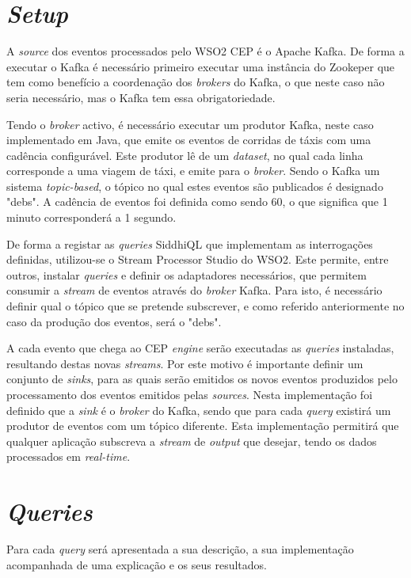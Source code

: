 \documentclass[article]{IEEEtran}
\begin{document}
\section{\textit{Setup}}

A \textit{source} dos eventos processados pelo WSO2 CEP é o Apache Kafka. De forma a executar o Kafka é necessário primeiro executar uma instância do Zookeper que tem como benefício a coordenação dos \textit{brokers} do Kafka, o que neste caso não seria necessário, mas o Kafka tem essa obrigatoriedade.

Tendo o \textit{broker} activo, é necessário executar um produtor Kafka, neste caso implementado em Java, que emite os eventos de corridas de táxis com uma cadência configurável. Este produtor lê de um \textit{dataset}, no qual cada linha corresponde a uma viagem de táxi, e emite para o \textit{broker}. Sendo o Kafka um sistema \textit{topic-based}, o tópico no qual estes eventos são publicados é designado "debs". A cadência de eventos foi definida como sendo 60, o que significa que 1 minuto corresponderá a 1 segundo.

De forma a registar as \textit{queries} SiddhiQL que implementam as interrogações definidas, utilizou-se o Stream Processor Studio do WSO2. Este permite, entre outros, instalar \textit{queries} e definir os adaptadores necessários, que permitem consumir a \textit{stream} de eventos através do \textit{broker} Kafka. Para isto, é necessário definir qual o tópico que se pretende subscrever, e como referido anteriormente no caso da produção dos eventos, será o "debs".

A cada evento que chega ao CEP \textit{engine} serão executadas as \textit{queries} instaladas, resultando destas novas \textit{streams}. Por este motivo é importante definir um conjunto de \textit{sinks}, para as quais serão emitidos os novos eventos produzidos pelo processamento dos eventos emitidos pelas \textit{sources}. Nesta implementação foi definido que a \textit{sink} é o \textit{broker} do Kafka, sendo que para cada \textit{query} existirá um produtor de eventos com um tópico diferente. Esta implementação permitirá que qualquer aplicação subscreva a \textit{stream} de \textit{output} que desejar, tendo os dados processados em \textit{real-time}.
 





\section{\textit{Queries}}
Para cada \textit{query} será apresentada a sua descrição, a sua implementação acompanhada de uma explicação e os seus resultados.
\end{document}
